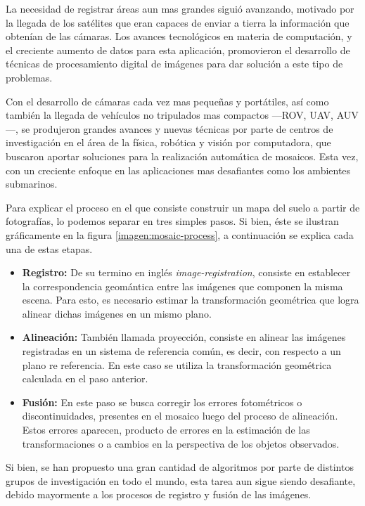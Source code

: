 La necesidad de registrar áreas aun mas grandes siguió avanzando, motivado por la llegada de los satélites que eran capaces de enviar a tierra la información que obtenían de las cámaras. Los avances tecnológicos en materia de computación, y el creciente aumento de datos para esta aplicación, promovieron el desarrollo de técnicas de procesamiento digital de imágenes para dar solución a este tipo de problemas.

Con el desarrollo de cámaras cada vez mas pequeñas y portátiles, así como también la llegada de vehículos no tripulados mas compactos ---ROV, UAV, AUV---, se produjeron grandes avances y nuevas técnicas por parte de centros de investigación en el área de la física, robótica y visión por computadora, que buscaron aportar soluciones para la realización automática de mosaicos. Esta vez, con un creciente enfoque en las aplicaciones mas desafiantes como los ambientes submarinos.

Para explicar el proceso en el que consiste construir un mapa del suelo a partir de fotografías, lo podemos separar en tres simples pasos. Si bien, éste se ilustran gráficamente en la figura \ref{imagen:mosaic-process}, a continuación se explica cada una de estas etapas.

\begin{itemize}
	\item \textbf{Registro:} De su termino en inglés \textit{image-registration}, consiste en establecer la correspondencia geomántica entre las imágenes que componen la misma escena. Para esto, es necesario estimar la transformación geométrica que logra alinear dichas imágenes en un mismo plano.
	
	\item \textbf{Alineación:} También llamada proyección, consiste en alinear las imágenes registradas en un sistema de referencia común, es decir, con respecto a un plano re referencia. En este caso se utiliza la transformación geométrica calculada en el paso anterior.
	
	\item \textbf{Fusión:} En este paso se busca corregir los errores fotométricos o discontinuidades, presentes en el mosaico luego del proceso de alineación. Estos errores aparecen, producto de errores en la estimación de las transformaciones o a cambios en la perspectiva de los objetos observados.
\end{itemize}

Si bien, se han propuesto una gran cantidad de algoritmos por parte de distintos grupos de investigación en todo el mundo, esta tarea aun sigue siendo desafiante, debido mayormente a los procesos de registro y fusión de las imágenes.

